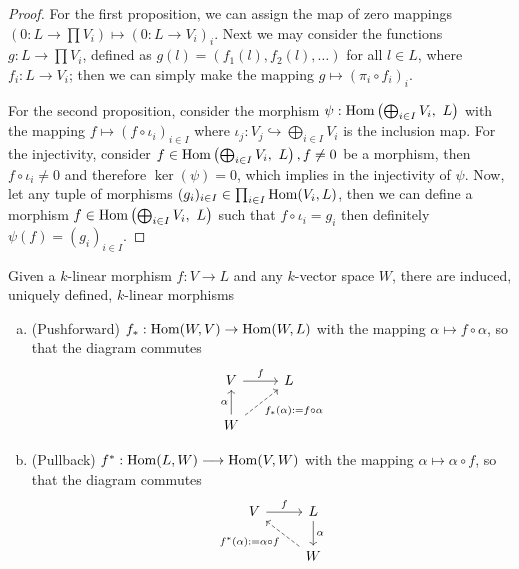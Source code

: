 \begin{proof}
  For the first proposition, we can assign the map of zero mappings \((0 : L \to
  \prod V_i) \longmapsto (0 : L \to V_i)_i\). Next we may consider the functions
  \(g : L \to \prod V_i\), defined as \(g(l) = (f_1(l), f_2(l), \dots)\) for all
  \(l \in L\), where \(f_i : L \to V_i\); then we can simply make the mapping
  \(g \longmapsto (\pi_i \circ f_i)_i\).

  For the second proposition, consider the morphism \(\psi : \operatorname{Hom}\left(
  \bigoplus_{i \in I} V_i,\ L \right) \) with the mapping \(f \mapsto (f \circ
  \iota_i)_{i \in I}\) where \(\iota_j: V_j \hookrightarrow \bigoplus_{i \in
  I} V_i\) is the inclusion map. For the injectivity, consider \(f \in
  \operatorname{Hom}\left( \bigoplus_{i \in I} V_i,\ L \right), f \neq 0\) be a morphism,
  then \(f \circ \iota_i \neq 0\) and therefore \(\ker(\psi) = 0\), which
  implies in the injectivity of \(\psi\). Now, let any tuple of morphisms
  \((g_i)_{i \in I} \in \prod_{i \in I} \operatorname{Hom}(V_i, L)\), then we can define a
  morphism \(f \in \operatorname{Hom}\left( \bigoplus_{i \in I} V_i,\ L \right)\) such that
  \(f \circ \iota_i = g_i\) then definitely \(\psi(f) = (g_i)_{i \in I}\).
\end{proof}

\begin{definition}
  Given a \(k\)-linear morphism \(f : V \to L\) and any \(k\)-vector space
  \(W\), there are induced, uniquely defined, \(k\)-linear morphisms
  \begin{enumerate}[(a)]
    \item (Pushforward) \(f_\ast : \operatorname{Hom}(W, V) \to \operatorname{Hom}(W, L)\) with the mapping
      \(\alpha \mapsto f \circ \alpha\), so that the diagram commutes
      \[
        \begin{tikzcd}
          V \ar[r, "f"]
            &L \\
          W \ar[u, "\alpha"]
          \ar[ur, dashed, swap, "f_\ast(\alpha) := f \circ \alpha"]
        \end{tikzcd}
      \]
    \item (Pullback) \(f^\ast : \operatorname{Hom}(L, W) \longrightarrow \operatorname{Hom}(V, W)\) with
      the mapping \(\alpha \longmapsto \alpha \circ f\), so that the diagram
      commutes
      \[
        \begin{tikzcd}
          V \ar[r, "f"]
            &L \ar[d, "\alpha"] \\
            &W \ar[ul, dashed, "f^\ast(\alpha) := \alpha \circ f"]
        \end{tikzcd}
      \]
  \end{enumerate}
\end{definition}

